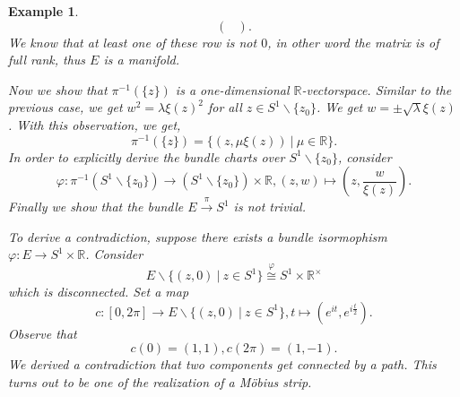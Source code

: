 \documentclass[10pt]{article}
\newtheorem{example}{Example}[section]
\newcommand{\R}[0]{\mathbb{R}}
\newcommand{\sep}[0]{\:|\:}
\begin{document}
\begin{example}
\begin{equation*}
\begin{pmatrix}
    \end{pmatrix}.
  \end{equation*}
  We know that at least one of these row is not $0$, in other word the matrix is of full rank, thus $E$ is a manifold.
  \par Now we show that $\pi^{-1}(\{z\})$ is a one-dimensional $\R$-vectorspace. Similar to the previous case, we get $w^2 = \lambda\xi(z)^2$ for all $z\in S^1\backslash\{z_0\}$. We get $w =\pm\sqrt{\lambda}\xi(z)$. With this observation, we get,
  \begin{equation*}
    \pi^{-1}(\{z\}) = \{(z,\mu\xi(z))\sep\mu\in\R\}.
  \end{equation*}
  In order to explicitly derive the bundle charts over $S^1\backslash\{z_0\}$, consider 
  \begin{equation*}
    \varphi:\pi^{-1}(S^1\backslash\{z_0\})\to(S^1\backslash\{z_0\})\times \R, (z,w)\mapsto \left(z,{\frac w {\xi(z)}}\right).
  \end{equation*}
  Finally we show that the bundle $E\stackrel{\pi}{\to}S^1$ is not trivial.
  \par To derive a contradiction, suppose there exists a bundle isormophism $\varphi:E\to S^1\times \R$. Consider 
  \begin{equation*}
    E\backslash\{(z,0)\sep z\in S^1\}\stackrel{\varphi}{\cong}S^1\times\R^\times
  \end{equation*}
  which is disconnected. Set a map
  \begin{equation*}
    c:[0,2\pi]\to E\backslash\{(z,0)\sep z\in S^1\}, t\mapsto (e^{it},e^{i{\frac t 2}}).
  \end{equation*}
  Observe that 
  \begin{equation*}
    c(0) = (1,1), c(2\pi) = (1,-1).
  \end{equation*}
  We derived a contradiction that two components get connected by a path. This turns out to be one of the realization of a Möbius strip.
\end{example}

\end{document}
